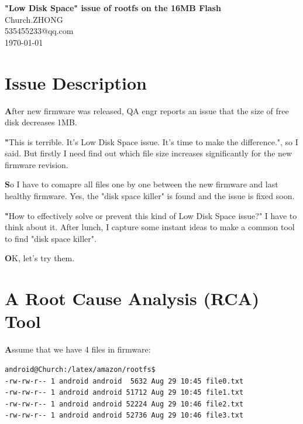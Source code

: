 \documentclass{article}
\begin{document}
\begin{titlepage}
	\begin{center}
		\Large\textbf{"Low Disk Space" issue of rootfs on the 16MB Flash}\\
		\vspace{1.0cm}
		\large\textsf{Church.ZHONG}\\
		\vspace{1.0cm}
		\large\textsf{535455233@qq.com}\\
		\vspace{1.0cm}
		\large\textsf{\today}
	\end{center}
\end{titlepage}

\setlength{\parindent}{20pt}

\section{Issue Description}

\textbf
After new firmware was released, QA engr reports an issue that the size of free disk decreases 1MB.

\textbf
"This is terrible. It's Low Disk Space issue. It's time to make the difference.", so I said.
But firstly I need find out which file size increases significantly for the new firmware revision.

\textbf
So I have to comapre all files one by one between the new firmware and last healthy firmware.
Yes, the "disk space killer" is found and the issue is fixed soon.

\textbf
"How to effectively solve or prevent this kind of Low Disk Space issue?" I have to think about it.
After lunch, I capture some instant ideas to make a common tool to find "disk space killer".

\textbf
OK, let's try them.


\section{A Root Cause Analysis (RCA) Tool}

\textbf
Assume that we have 4 files in firmware:


\begin{lstlisting}[language={bash}]
android@Church:/latex/amazon/rootfs$
-rw-rw-r-- 1 android android  5632 Aug 29 10:45 file0.txt
-rw-rw-r-- 1 android android 51712 Aug 29 10:45 file1.txt
-rw-rw-r-- 1 android android 52224 Aug 29 10:46 file2.txt
-rw-rw-r-- 1 android android 52736 Aug 29 10:46 file3.txt
    \end{lstlisting}
\end{document}
